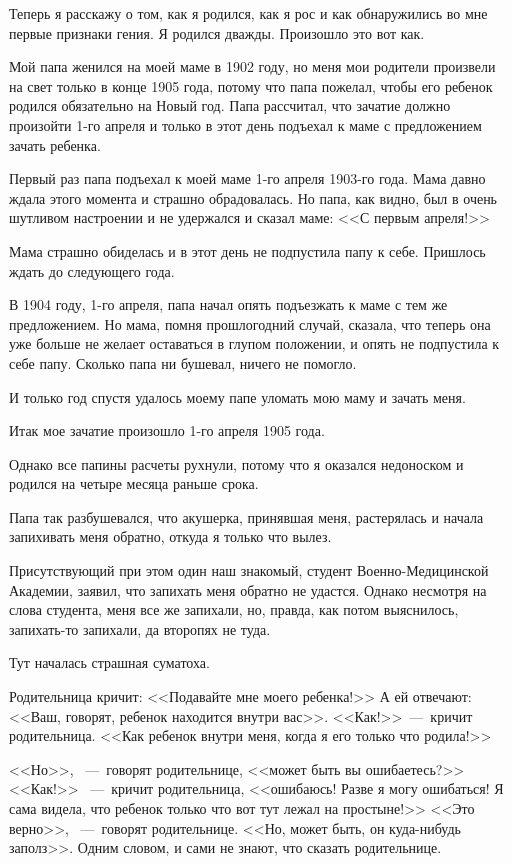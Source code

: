 Теперь я расскажу о том, как я родился, как я рос и как обнаружились во мне первые признаки гения. Я родился дважды. Произошло это вот как.

Мой папа женился на моей маме в 1902 году, но меня мои родители произвели на свет только в конце 1905 года, потому что папа пожелал, чтобы его ребенок родился обязательно на Новый год. Папа рассчитал, что зачатие должно произойти 1-го апреля и только в этот день подъехал к маме с предложением зачать ребенка.

Первый раз папа подъехал к моей маме 1-го апреля 1903-го года. Мама давно ждала этого момента и страшно обрадовалась. Но папа, как видно, был в очень шутливом настроении и не удержался и сказал маме: <<С первым апреля!>>

Мама страшно обиделась и в этот день не подпустила папу к себе. Пришлось ждать до следующего года.

В 1904 году, 1-го апреля, папа начал опять подъезжать к маме с тем же предложением. Но мама, помня прошлогодний случай, сказала, что теперь она уже больше не желает оставаться в глупом положении, и опять не подпустила к себе папу. Сколько папа ни бушевал, ничего не помогло.

И только год спустя удалось моему папе уломать мою маму и зачать меня.

Итак мое зачатие произошло 1-го апреля 1905 года.

Однако все папины расчеты рухнули, потому что я оказался недоноском и родился на четыре месяца раньше срока.

Папа так разбушевался, что акушерка, принявшая меня, растерялась и начала запихивать меня обратно, откуда я только что вылез.

Присутствующий при этом один наш знакомый, студент Военно-Медицинской Академии, заявил, что запихать меня обратно не удастся. Однако несмотря на слова студента, меня все же запихали, но, правда, как потом выяснилось, запихать-то запихали, да второпях не туда.

Тут началась страшная суматоха.

Родительница кричит: <<Подавайте мне моего ребенка!>> А ей отвечают: <<Ваш, говорят, ребенок находится внутри вас>>. <<Как!>>\ ---~кричит родительница. <<Как ребенок внутри меня, когда я его только что родила!>>

<<Но>>, \ ---~говорят родительнице, <<может быть вы ошибаетесь?>> <<Как!>> \ ---~кричит родительница, <<ошибаюсь! Разве я могу ошибаться! Я сама видела, что ребенок только что вот тут лежал на простыне!>> <<Это верно>>, \ ---~говорят родительнице. <<Но, может быть, он куда-нибудь заполз>>. Одним словом, и сами не знают, что сказать родительнице.

